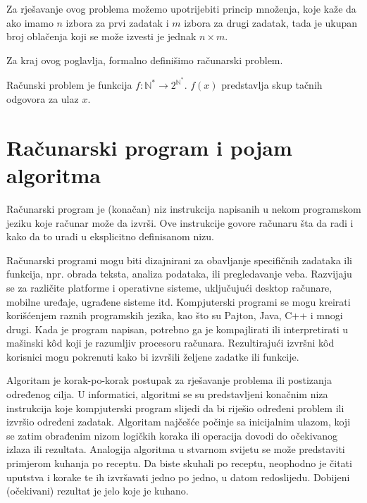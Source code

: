 Za rješavanje ovog problema možemo upotrijebiti princip množenja, koje kaže da ako imamo $ n$ izbora za prvi zadatak i $m$ izbora za drugi zadatak, tada je ukupan broj oblačenja koji se može izvesti je jednak  $n \times m$.

Za kraj ovog poglavlja, formalno definišimo računarski problem.

\begin{definition}
	Računski problem je funkcija $f \colon \mathbb{N}^* \rightarrow 2^{\mathbb{N}^*}$. $f (x)$ predstavlja skup tačnih odgovora  za ulaz $x$.
\end{definition} 
 
\section{Računarski program i pojam algoritma}

Računarski program je (konačan) niz instrukcija napisanih u nekom programskom jeziku koje računar  može da izvrši. Ove instrukcije govore računaru šta da radi i kako da to uradi u eksplicitno definisanom nizu.

Računarski programi mogu biti dizajnirani za obavljanje specifičnih zadataka ili funkcija,  npr. obrada teksta, analiza podataka,  ili pregledavanje veba.  Razvijaju se za različite platforme i operativne sisteme, uključujući desktop računare, mobilne uređaje, ugrađene sisteme itd.  Kompjuterski programi se mogu kreirati korišćenjem raznih programskih jezika, kao što su Pajton, Java, C++  i mnogi drugi. Kada je program napisan, potrebno ga je kompajlirati ili interpretirati u mašinski k\^od koji je razumljiv procesoru računara. Rezultirajući izvršni k\^od korisnici mogu pokrenuti kako bi izvršili željene zadatke ili funkcije.

Algoritam je  korak-po-korak postupak za rješavanje problema ili postizanja određenog   cilja. U informatici, algoritmi se su predstavljeni konačnim  niza instrukcija koje kompjuterski program slijedi da bi riješio određeni problem ili izvršio određeni zadatak. Algoritam najčešće počinje sa inicijalnim ulazom, koji se zatim obrađenim nizom logičkih koraka ili operacija dovodi do očekivanog izlaza ili rezultata.  Analogija algoritma u stvarnom svijetu se može predstaviti primjerom kuhanja po receptu. Da biste skuhali po receptu, neophodno je čitati uputstva i korake te ih izvršavati jedno po jedno, u datom redoslijedu. Dobijeni (očekivani) rezultat je jelo koje je kuhano.  

